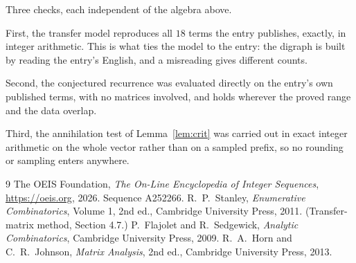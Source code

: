 \documentclass[11pt,a4paper]{article}
\theoremstyle{plain}
\theoremstyle{definition}
\begin{document}
Three checks, each independent of the algebra above.

First, the transfer model reproduces all $18$ terms the entry publishes, exactly, in
integer arithmetic. This is what ties the model to the entry: the digraph is built by reading
the entry's English, and a misreading gives different counts.

Second, the conjectured recurrence was evaluated directly on the entry's own published terms,
with no matrices involved, and holds wherever the proved range and the data overlap.

Third, the annihilation test of Lemma~\ref{lem:crit} was carried out in exact integer
arithmetic on the whole vector rather than on a sampled prefix, so no rounding or sampling
enters anywhere.

\begin{thebibliography}{9}
 The OEIS Foundation, \emph{The On-Line Encyclopedia of Integer
Sequences}, \url{https://oeis.org}, 2026. Sequence A252266.
 R.~P.~Stanley, \emph{Enumerative Combinatorics}, Volume 1, 2nd ed.,
Cambridge University Press, 2011. (Transfer-matrix method, Section 4.7.)
 P.~Flajolet and R.~Sedgewick, \emph{Analytic Combinatorics}, Cambridge
University Press, 2009.
 R.~A.~Horn and C.~R.~Johnson, \emph{Matrix Analysis}, 2nd ed., Cambridge
University Press, 2013.
\end{thebibliography}
\end{document}
